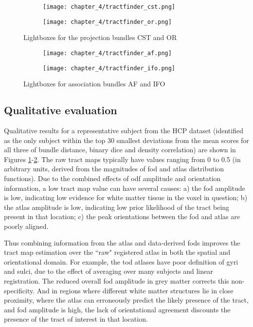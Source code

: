 \begin{figure}[htb!]
  \centering
  \begin{subfigure}{0.8\textwidth}
    \texttt{[image: chapter\_4/tractfinder\_cst.png]}
    \caption{}
  \end{subfigure}
  \begin{subfigure}{0.8\textwidth}
    \texttt{[image: chapter\_4/tractfinder\_or.png]}
    \caption{}
  \end{subfigure}
  \caption{ Lightboxes for the projection bundles CST and OR}
  \label{fig:lb.cstor}
\end{figure}
\begin{figure}[htb!]
  \centering
  \begin{subfigure}{\textwidth}
    \texttt{[image: chapter\_4/tractfinder\_af.png]}
    \caption{}
  \end{subfigure}
  \begin{subfigure}{\textwidth}
    \texttt{[image: chapter\_4/tractfinder\_ifo.png]}
    \caption{}
  \end{subfigure}
  \caption{ Lightboxes for association bundles AF and IFO}
  \label{fig:lb.afifo}
\end{figure}

\clearpage
\subsection{Qualitative evaluation}

Qualitative results for a representative subject from the HCP dataset (identified as the only subject within the top 30 smallest deviations from the mean scores for all three of bundle distance, binary \gls{dice} and density correlation) are shown in Figures \ref{fig:lb.cstor}-\ref{fig:lb.afifo}.
The raw tract maps typically have values ranging from 0 to 0.5 (in arbitrary units, derived from the magnitudes of \gls{fod} and atlas distribution functions).
Due to the combined effects of \gls{odf} amplitude and orientation information, a low tract map value can have several causes: a) the \gls{fod} amplitude is low, indicating low evidence for white matter tissue in the voxel in question; b) the atlas amplitude is low, indicating low prior likelihood of the tract being present in that location; c) the peak orientations between the \gls{fod} and atlas are poorly aligned.

Thus combining information from the atlas and data-derived \gls{fod}s improves the tract map estimation over the ``raw" registered atlas in both the spatial and orientational domain. For example, the \gls{tod} atlases have poor definition of gyri and sulci, due to the effect of averaging over many subjects and linear registration. The reduced overall \gls{fod} amplitude in grey matter corrects this non-specificity. And in regions where different white matter structures lie in close proximity, where the atlas can erroneously predict the likely presence of the tract, and \gls{fod} amplitude is high, the lack of orientational agreement discounts the presence of the tract of interest in that location.

